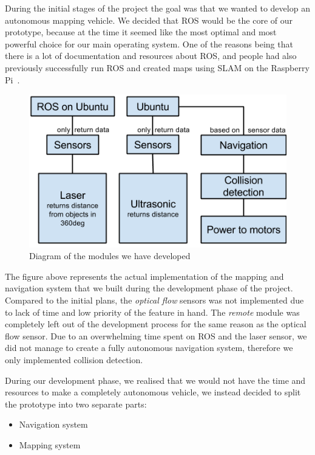 During the initial stages of the project the goal was that we wanted to develop an autonomous mapping vehicle. We decided that ROS would be the core of our prototype, because at the time it seemed like the most optimal and most powerful choice for our main operating system. One of the reasons being that there is a lot of documentation and resources about ROS, and people had also previously successfully run ROS and created maps using SLAM on the Raspberry Pi~\cite{pibot}\cite{pibotbook}.

\begin{figure}[H]
	\centering
	\includegraphics[scale=.7]{images/developmentdiagram2.png}
	\caption{Diagram of the modules we have developed}
	\label{fig:developmentdiagram2}
\end{figure}

The figure above represents the actual implementation of the mapping and navigation system that we built during the development phase of the project. Compared to the initial plans, the \textit{optical flow} sensors was not implemented due to lack of time and low priority of the feature in hand. The \textit{remote} module was completely left out of the development process for the same reason as the optical flow sensor. Due to an overwhelming time spent on ROS and the laser sensor, we did not manage to create a fully autonomous navigation system, therefore we only implemented collision detection.

During our development phase, we realised that we would not have the time and resources to make a completely autonomous vehicle, we instead decided to split the prototype into two separate parts: 
\begin{itemize}
	\item Navigation system
	\item Mapping system
\end{itemize}

